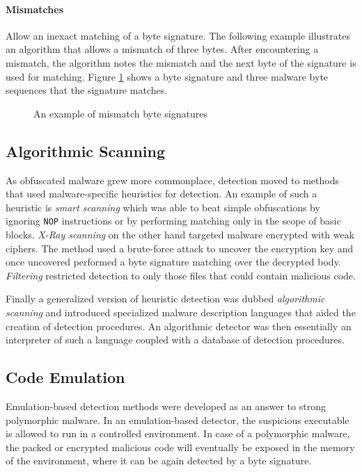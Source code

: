 \paragraph*{Mismatches} Allow an inexact matching of a byte signature. The following example illustrates an algorithm that allows a mismatch of three bytes. After encountering a mismatch, the algorithm notes the mismatch and the next byte of the signature is used for matching. Figure \ref{fig_mismatch} shows a byte signature and three malware byte sequences that the signature matches.

\begin{figure}[H]
    \centering
    \caption{An example of mismatch byte signatures}
    \label{fig_mismatch}
\end{figure}

\subsection{Algorithmic Scanning}
As obfuscated malware grew more commonplace, detection moved to methods that used malware-specific heuristics for detection. An example of such a heuristic is \emph{smart scanning} which was able to beat simple obfuscations by ignoring \texttt{NOP} instructions or by performing matching only in the scope of basic blocks. \emph{X-Ray scanning} on the other hand targeted malware encrypted with weak ciphers. The method used a brute-force attack to uncover the encryption key and once uncovered performed a byte signature matching over the decrypted body. \emph{Filtering} restricted detection to only those files that could contain malicious code.

Finally a generalized version of heuristic detection was dubbed \emph{algorithmic scanning} and introduced specialized malware description languages that aided the creation of detection procedures. An algorithmic detector was then essentially an interpreter of such a language coupled with a database of detection procedures.

\subsection{Code Emulation}
Emulation-based detection methods were developed as an answer to strong polymorphic malware. In an emulation-based detector, the suspicious executable is allowed to run in a controlled environment. In case of a polymorphic malware, the packed or encrypted malicious code will eventually be exposed in the memory of the environment, where it can be again detected by a byte signature.

